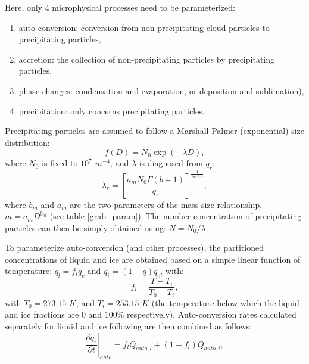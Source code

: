 \documentclass[12pt,A4,french]{article}
\begin{document}
\begin{description}
Here, only 4 microphysical processes need to be parameterized:
\begin{enumerate}
    \item auto-conversion: conversion from non-precipitating cloud particles to precipitating particles,
    \item accretion: the collection of non-precipitating particles by precipitating particles,
    \item phase changes: condensation and evaporation, or deposition and sublimation),
    \item precipitation: only concerns precipitating particles.
\end{enumerate}

Precipitating particles are assumed to follow a Marshall-Palmer (exponential) size distribution:
\begin{equation}
    f\left(D\right) = N_0 \exp\left(-\lambda D\right),
\end{equation}
where $N_0$ is fixed to $10^7$ $m^{-4}$, and $\lambda$ is diagnosed from $q_r$:
\begin{equation}
    \lambda_r = \left[ \frac{a_m N_0 \Gamma\left(b + 1\right)}{q_r} \right]^{\frac{1}{b_m + 1}},
\end{equation}
where $b_m$ and $a_m$ are the two parameters of the mass-size relationship, $m = a_m D^{b_m}$ (see table \ref{grab_param}). The number concentration of precipitating particles can then be simply obtained using: $N = N_0 / \lambda$. 

To parameterize auto-conversion (and other processes), the partitioned concentrations of liquid and ice are obtained based on a simple linear function of temperature: $q_l = f_l q_c$ and $q_i = \left(1 - q\right)q_c$, with:
\begin{equation}
    f_l = \frac{T - T_i}{T_0 - T_i},
\end{equation}
with $T_0 = 273.15$ $K$, and $T_i = 253.15$ $K$ (the temperature below which the liquid and ice fractions are $0$ and $100 \%$ respectively). Auto-conversion rates calculated separately for liquid and ice following \cite{Gra1998} are then combined as follows:
\begin{equation}
     \left.\frac{\partial q_{r}}{\partial t}\right|_{auto} = f_{l}Q_{auto,l} + \left(1-f_{l}\right)Q_{auto,i}, \label{auto_grab}
\end{equation}


\end{description}
\end{document}
